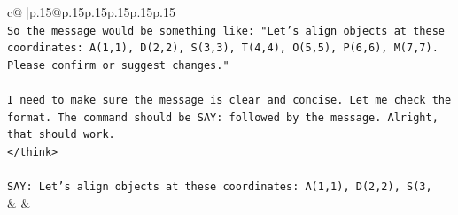 \documentclass{article}
\begin{document}
{\begin{supertabular}{c@{$\;$}|p{.15\linewidth}@{}p{.15\linewidth}p{.15\linewidth}p{.15\linewidth}p{.15\linewidth}p{.15\linewidth}}
{{{\\ 
\texttt{So the message would be something like: "Let's align objects at these coordinates: A(1,1), D(2,2), S(3,3), T(4,4), O(5,5), P(6,6), M(7,7). Please confirm or suggest changes."} \\
\\ 
\texttt{I need to make sure the message is clear and concise. Let me check the format. The command should be SAY: followed by the message. Alright, that should work.} \\
\texttt{</think>} \\
\\ 
\texttt{SAY: Let's align objects at these coordinates: A(1,1), D(2,2), S(3,} \\
            }
        }
    }
    & & \\ \\


\end{supertabular}}
\end{document}
